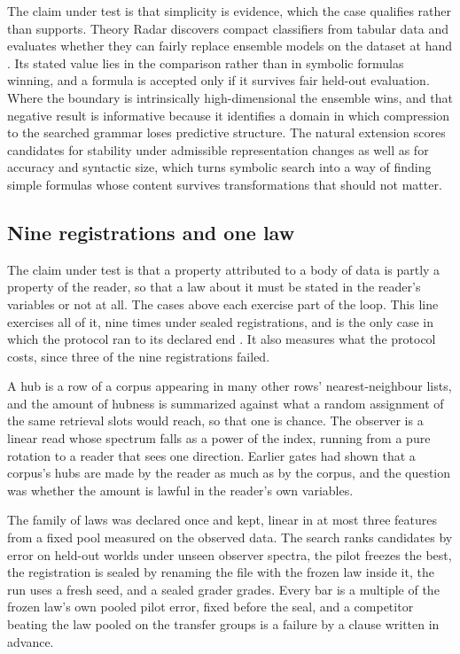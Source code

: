 \documentclass[11pt]{article}
\theoremstyle{remark}
\begin{document}
The claim under test is that simplicity is evidence, which the case qualifies
rather than supports. Theory Radar discovers compact classifiers from tabular data
and evaluates whether they can fairly replace ensemble models on the dataset at
hand \citep{bond2026radar}. Its stated value lies in the comparison rather than in
symbolic formulas winning, and a formula is accepted only if it survives fair
held-out evaluation. Where the boundary is intrinsically high-dimensional the
ensemble wins, and that negative result is informative because it identifies a
domain in which compression to the searched grammar loses predictive structure. The
natural extension scores candidates for stability under admissible representation
changes as well as for accuracy and syntactic size, which turns symbolic search
into a way of finding simple formulas whose content survives transformations that
should not matter.

\subsection{Nine registrations and one law}
\label{sec:od}

The claim under test is that a property attributed to a body of data is partly a
property of the reader, so that a law about it must be stated in the reader's
variables or not at all. The cases above each exercise part of the loop. This line
exercises all of it, nine times under sealed registrations, and is the only case in
which the protocol ran to its declared end \citep{bond2026odline}. It also measures
what the protocol costs, since three of the nine registrations failed.

A hub is a row of a corpus appearing in many other rows' nearest-neighbour lists,
and the amount of hubness is summarized against what a random assignment of the
same retrieval slots would reach, so that one is chance. The observer is a linear
read whose spectrum falls as a power of the index, running from a pure rotation to
a reader that sees one direction. Earlier gates had shown that a corpus's hubs are
made by the reader as much as by the corpus, and the question was whether the
amount is lawful in the reader's own variables.

The family of laws was declared once and kept, linear in at most three features
from a fixed pool measured on the observed data. The search ranks candidates by
error on held-out worlds under unseen observer spectra, the pilot freezes the best,
the registration is sealed by renaming the file with the frozen law inside it, the
run uses a fresh seed, and a sealed grader grades. Every bar is a multiple of the
frozen law's own pooled pilot error, fixed before the seal, and a competitor
beating the law pooled on the transfer groups is a failure by a clause written in
advance.
\end{document}

